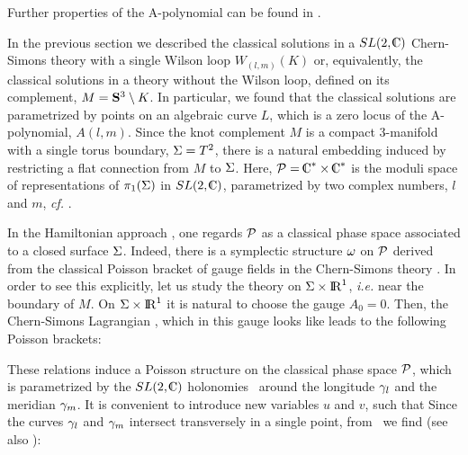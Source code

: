\noindent
Further properties of the A-polynomial can be found
in .




In the previous section we described the classical solutions in
a $SL(2,\IC)$ Chern-Simons theory with a single Wilson loop
$W_{(l,m)} (K)$ or, equivalently, the classical solutions in a theory
without the Wilson loop, defined on its complement, $M = \S^3 \setminus K$.
In particular, we found that the classical solutions
are parametrized by points on an algebraic curve $L$,
which is a zero locus of the A-polynomial, $A(l,m)$.
Since the knot complement $M$ is a compact 3-manifold with
a single torus boundary, $\Si=T^2$, there is a natural embedding
%
\eqn{}
%
induced by restricting a flat connection from $M$ to $\Si$.
Here, $\CP = \IC^* \times \IC^*$ is the moduli space
of representations of $\pi_1(\Si)$ in $SL(2,\IC)$,
parametrized by two complex numbers, $l$ and $m$,
{\it cf.} \lmholonomies.

In the Hamiltonian approach \WittenJones, one regards $\CP$
as a classical phase space associated to a closed surface $\Si$.
Indeed, there is a symplectic structure $\om$ on $\CP$
derived from the classical Poisson bracket of gauge fields in
the Chern-Simons theory \iaction.
In order to see this explicitly, let us study the theory
on $\Si \times \IR^1$, {\it i.e.} near the boundary of $M$.
On $\Si \times \IR^1$ it is natural to choose the gauge $A_0=0$.
Then, the Chern-Simons Lagrangian \iaction,
which in this gauge looks like
%
\eqn{}
%
leads to the following Poisson brackets:
%
\eqn{}
%

These relations induce a Poisson structure on the classical
phase space $\CP$, which is parametrized by the $SL(2,\IC)$
holonomies \lmholonomies\ around the longitude $\g_l$ and
the meridian $\g_m$.
It is convenient to introduce new variables $u$ and $v$, such that
%
\eqn{}
%
Since the curves $\g_l$ and $\g_m$ intersect transversely in
a single point, from \cspb\ we find (see also ):
%
\eqn{}
%

